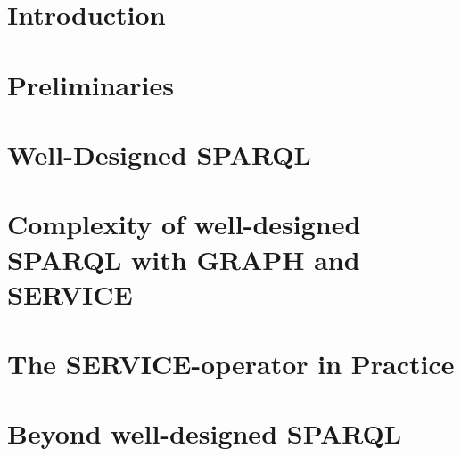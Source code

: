 \documentclass[draft,final]{vutinfth} %
\begin{document}

\tableofcontents %

\mainmatter

\chapter{Introduction}


\chapter{Preliminaries}


\chapter{Well-Designed SPARQL}


\chapter{Complexity of well-designed SPARQL with GRAPH and SERVICE}


\chapter{The SERVICE-operator in Practice}\label{chapter:serviceeval}


\chapter{Beyond well-designed SPARQL}

\end{document}
